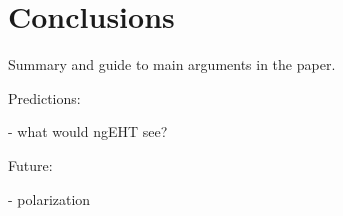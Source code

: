 \section{Conclusions}\label{sec:conclusions}


Summary and guide to main arguments in the paper.


Predictions:

- what would ngEHT see?

Future:

- polarization

